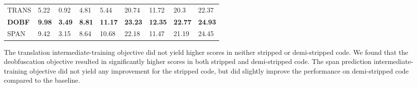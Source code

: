 \begin{table}[!h]
\begin{tabular}{l|llll|llll}
TRANS                                                  & 5.22                                & 0.92     & 4.81  &  5.44                                                       & 20.74                              & 11.72                               & 20.3  &  22.37                               \\
\textbf{DOBF}                                          & \textbf{9.98}                       & \textbf{3.49}                    & \textbf{8.81}                       & \textbf{11.17}                       & \textbf{23.23}                     & \textbf{12.35}                   & \textbf{22.77}                       & \textbf{24.93}                        \\
SPAN                                                   & 9.42                                & 3.15                             & 8.64  &  10.68                                & 22.18                              & 11.47                            & 21.19                                &   24.45                              
\end{tabular}
\end{table}
The translation intermediate-training objective did not yield higher scores in neither stripped or demi-stripped code. We found that the deobfuscation objective resulted in significantly higher scores in both stripped and demi-stripped code. The span prediction intermediate-training objective did not yield any improvement for the stripped code, but did slightly improve the performance on demi-stripped code compared to the baseline.
